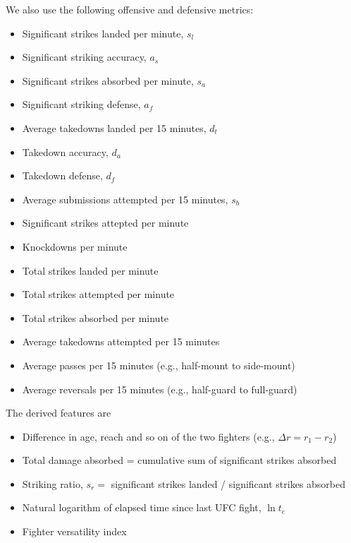 \noindent
We also use the following offensive and defensive metrics:

\begin{itemize}[noitemsep]
  \item Significant strikes landed per minute, $s_l$
  \item Significant striking accuracy, $a_s$
  \item Significant strikes absorbed per minute, $s_a$
  \item Significant striking defense, $a_f$
  \item Average takedowns landed per 15 minutes, $d_t$
  \item Takedown accuracy, $d_a$
  \item Takedown defense, $d_f$
  \item Average submissions attempted per 15 minutes, $s_b$
\end{itemize}

\begin{itemize}[noitemsep]
  \item Significant strikes attepted per minute
  \item Knockdowns per minute
  \item Total strikes landed per minute
  \item Total strikes attempted per minute
  \item Total strikes absorbed per minute
  \item Average takedowns attempted per 15 minutes
  \item Average passes per 15 minutes (e.g., half-mount to side-mount)
  \item Average reversals per 15 minutes (e.g., half-guard to full-guard)
\end{itemize}

\noindent
The derived features are

\begin{itemize}[noitemsep]
  \item Difference in age, reach and so on of the two fighters (e.g., $\Delta r=r_1-r_2$)
  \item Total damage absorbed = cumulative sum of significant strikes absorbed
  \item Striking ratio, $s_r =$ significant strikes landed / significant strikes absorbed
  \item Natural logarithm of elapsed time since last UFC fight, $\ln t_e$
  \item Fighter versatility index
\end{itemize}

